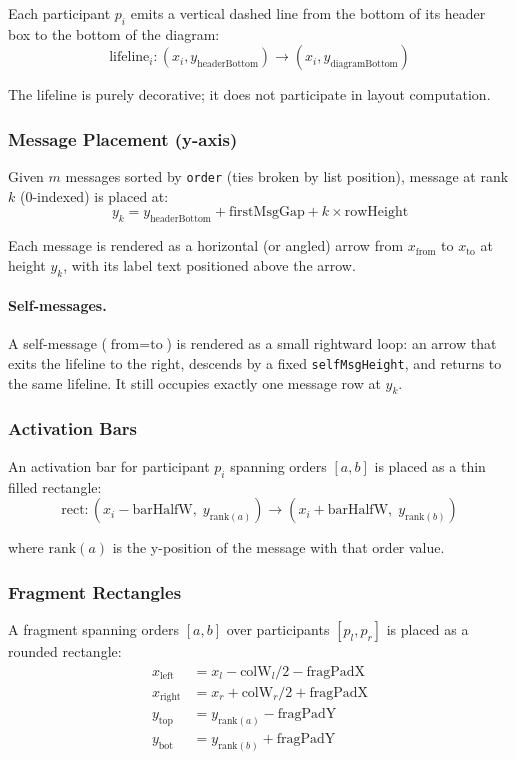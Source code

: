 Each participant $p_i$ emits a vertical dashed line from the bottom of its header box to the bottom of the diagram:
$$
  \text{lifeline}_i: (x_i, y_{\text{headerBottom}}) \longrightarrow (x_i, y_{\text{diagramBottom}})
$$

The lifeline is purely decorative; it does not participate in layout computation.

\subsubsection{Message Placement (y-axis)}

Given $m$ messages sorted by \texttt{order} (ties broken by list position), message at rank $k$ (0-indexed) is placed at:
$$
  y_k = y_{\text{headerBottom}} + \text{firstMsgGap} + k \times \text{rowHeight}
$$

Each message is rendered as a horizontal (or angled) arrow from $x_{\text{from}}$ to $x_{\text{to}}$ at height $y_k$, with its label text positioned above the arrow.

\paragraph{Self-messages.}
A self-message ($\text{from} = \text{to}$) is rendered as a small rightward loop: an arrow that exits the lifeline to the right, descends by a fixed \texttt{selfMsgHeight}, and returns to the same lifeline. It still occupies exactly one message row at $y_k$.

\subsubsection{Activation Bars}

An activation bar for participant $p_i$ spanning orders $[a, b]$ is placed as a thin filled rectangle:
$$
  \text{rect}: (x_i - \text{barHalfW},\; y_{\text{rank}(a)}) \longrightarrow (x_i + \text{barHalfW},\; y_{\text{rank}(b)})
$$

where $\text{rank}(a)$ is the y-position of the message with that order value.

\subsubsection{Fragment Rectangles}

A fragment spanning orders $[a, b]$ over participants $[p_l, p_r]$ is placed as a rounded rectangle:
\begin{align*}
  x_{\text{left}}  &= x_l - \text{colW}_l/2 - \text{fragPadX} \\
  x_{\text{right}} &= x_r + \text{colW}_r/2 + \text{fragPadX} \\
  y_{\text{top}}   &= y_{\text{rank}(a)} - \text{fragPadY} \\
  y_{\text{bot}}   &= y_{\text{rank}(b)} + \text{fragPadY}
\end{align*}

